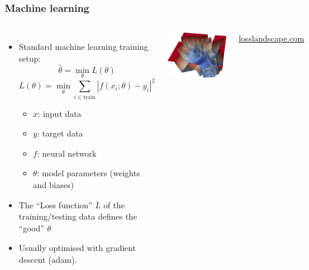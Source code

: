 \documentclass[aspectratio=169]{beamer}
\begin{document}
\begin{frame}
    \frametitle{Machine learning}
    \begin{columns}
        \begin{itemize}
            \item Standard machine learning training setup:
                \[ \hat{\theta} = \min_\theta L(\theta) \]
                \[ L(\theta) = \min_{\theta} \sum_{i\in\text{train}} |f(x_i;\theta)-y_i|^2 \]
                \begin{itemize}
                    \item $x$: input data
                    \item $y$: target data
                    \item $f$: neural network
                    \item $\theta$: model parameters (weights and biases)
                \end{itemize}
            \item The ``Loss function'' $L$ of the training/testing data defines the ``good'' $\theta$
            \item Usually optimised with gradient descent (adam).
        \end{itemize}
        
        \includegraphics[width=\textwidth]{figures/loss_landscape}

        \hfill\href{https://losslandscape.com}{losslandscape.com}
    \end{columns}
\end{frame}
\end{document}

